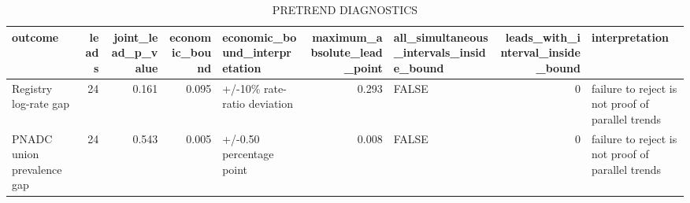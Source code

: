 \begin{table}[!htbp]
\centering
\begingroup\scriptsize
\begin{tabular}{lrrrlrlrl}
  \hline
outcome & leads & joint\_lead\_p\_value & economic\_bound & economic\_bound\_interpretation & maximum\_absolute\_lead\_point & all\_simultaneous\_intervals\_inside\_bound & leads\_with\_interval\_inside\_bound & interpretation \\ 
  \hline
Registry log-rate gap &   24 & 0.161 & 0.095 & +/-10\% rate-ratio deviation & 0.293 & FALSE &    0 & failure to reject is not proof of parallel trends \\ 
  PNADC union prevalence gap &   24 & 0.543 & 0.005 & +/-0.50 percentage point & 0.008 & FALSE &    0 & failure to reject is not proof of parallel trends \\ 
   \hline
\end{tabular}
\endgroup
\caption{PRETREND DIAGNOSTICS} 
\label{tab:pretrend_diagnostics}
\end{table}
